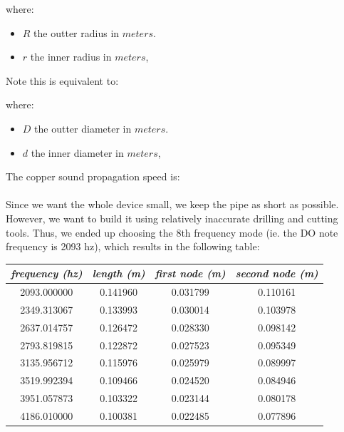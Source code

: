 \documentclass[12pt]{article}
\begin{document}
\begin{center}
\end{center}
where:
\begin{itemize}
  \item $R$ the outter radius in $meters$.
  \item $r$ the inner radius in $meters$,
\end{itemize}
Note this is equivalent to:
\begin{center}
\end{center}
where:
\begin{itemize}
  \item $D$ the outter diameter in $meters$.
  \item $d$ the inner diameter in $meters$,
\end{itemize}
The copper sound propagation speed is:
\begin{center}
\end{center}

\paragraph{} Since we want the whole device small, we keep the pipe as short
as possible. However, we want to build it using relatively inaccurate
drilling and cutting tools. Thus, we ended up choosing the 8th frequency mode
(ie. the DO note frequency is 2093 hz), which results in the following table:
\begin{center}
  \begin{tabular}{|c|c|c|c|}
    \hline
    \textit{frequency (hz)} &
    \textit{length (m)} &
    \textit{first node (m)} &
    \textit{second node (m)} \\
    \hline
    2093.000000 & 0.141960 & 0.031799 & 0.110161 \\
    \hline
    2349.313067 & 0.133993 & 0.030014 & 0.103978 \\
    \hline
    2637.014757 & 0.126472 & 0.028330 & 0.098142 \\
    \hline
    2793.819815 & 0.122872 & 0.027523 & 0.095349 \\
    \hline
    3135.956712 & 0.115976 & 0.025979 & 0.089997 \\
    \hline
    3519.992394 & 0.109466 & 0.024520 & 0.084946 \\
    \hline
    3951.057873 & 0.103322 & 0.023144 & 0.080178 \\
    \hline
    4186.010000 & 0.100381 & 0.022485 & 0.077896 \\
    \hline
\end{tabular}
\end{center}
\end{document}
